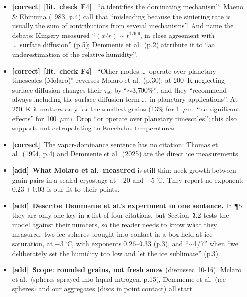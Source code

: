 \documentclass[11pt]{article}
\newcommand{\tC}{\textcolor{miss}{\textbf{[correct]}}\ }
\newcommand{\tA}{\textcolor{have}{\textbf{[add]}}\ }
\newcommand{\Chk}[1]{\textcolor{chk}{\textbf{[lit.\ check #1]}}\ }
\begin{document}
\begin{enumerate}
\begin{itemize}
    Table~I) and Demmenie et al.\ (2025, Table~1). Thomas et al.\ give ``$n=3$
    for vapour transport, $4\le n\le5$ for surface diffusion'' (p.3); cite
    them for what they measured: ``a neck growth proportional to $t^{1/3}$,
    i.e., the sublimation and recondensation process predominate at
    $-20\,^{\circ}$C'' (p.4).
  \item \tC \Chk{F4} ``$n$ identifies the dominating mechanism'': Maeno \&
    Ebinuma (1983, p.4) call that ``misleading because the sintering rate is
    usually the sum of contributions from several mechanisms''. And name the
    debate: Kingery measured ``$(x/r)\sim t^{1/6.9}$, in close agreement with
    \ldots\ surface diffusion'' (p.5); Demmenie et al.\ (p.2) attribute it to
    ``an underestimation of the relative humidity''.
  \item \tC \Chk{F4} ``Other modes \ldots\ operate over planetary timescales
    (Molaro)'' reverses Molaro et al.\ (p.30): at 200~K neglecting surface
    diffusion changes their $\tau_{50}$ by ``$\sim$3,700\%'', and they
    ``recommend always including the surface diffusion term \ldots\ in
    planetary applications''. At 250~K it matters only for the smallest
    grains (13\% for 1~$\mu$m; ``no significant effects'' for 100~$\mu$m).
    Drop ``or operate over planetary timescales''; this also supports not
    extrapolating to Enceladus temperatures.
  \item \tC The vapor-dominance sentence has no citation: Thomas et al.\
    (1994, p.4) and Demmenie et al.\ (2025) are the direct ice
    measurements.
  \item \tA \textbf{What Molaro et al.\ measured} is still thin: neck growth
    between grain pairs in a sealed cryostage at $-20$ and $-5\,^{\circ}$C.
    They report no exponent; $0.23\pm0.03$ is our fit to their points.
  \item \tA \textbf{Describe Demmenie et al.'s experiment in one sentence.} In
    \P5 they are only one key in a list of four citations, but Section~3.2
    tests the model against their numbers, so the reader needs to know what
    they measured: two ice spheres brought into contact in a box held at
    ice saturation, at $-3\,^{\circ}$C, with exponents 0.26--0.33 (p.3), and
    ``$\sim$1/7'' when ``we deliberately set the humidity too low and let the
    ice sublimate'' (p.3).
  \item \tA \textbf{Scope: rounded grains, not fresh snow} (discussed 10-16).
    Molaro et al.\ (spheres sprayed into liquid nitrogen, p.15), Demmenie et
    al.\ (ice spheres) and our aggregates (discs in point contact) all start

\end{itemize}
\end{enumerate}
\end{document}
